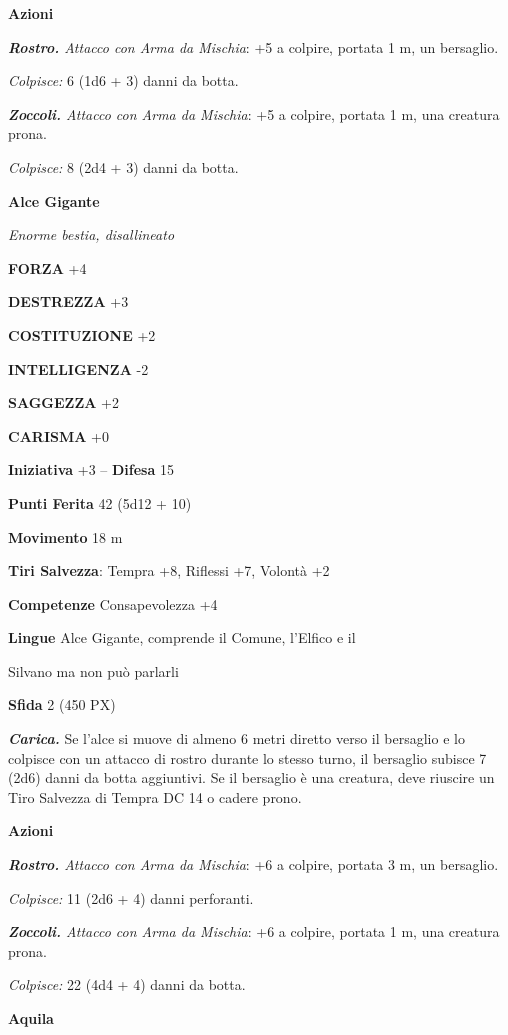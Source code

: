 \begin{multicols}{2}
\textbf{Azioni}

\textit{\textbf{Rostro.} Attacco con Arma da Mischia}: +5 a colpire, portata 1 m, un bersaglio.

\textit{Colpisce:} 6 (1d6 + 3) danni da botta.

\textit{\textbf{Zoccoli.} Attacco con Arma da Mischia}: +5 a colpire, portata 1 m, una creatura prona.

\textit{Colpisce:} 8 (2d4 + 3) danni da botta.

\medskip\textbf{Alce Gigante}

\textit{Enorme bestia, disallineato}

\textbf{FORZA} +4

\textbf{DESTREZZA} +3

\textbf{COSTITUZIONE} +2

\textbf{INTELLIGENZA} -2

\textbf{SAGGEZZA} +2

\textbf{CARISMA} +0

\textbf{Iniziativa} +3 -- \textbf{Difesa} 15

\textbf{Punti Ferita} 42 (5d12 + 10)

\textbf{Movimento} 18 m

\textbf{Tiri Salvezza}: Tempra +8, Riflessi +7, Volontà +2

\textbf{Competenze} Consapevolezza +4

\textbf{Lingue} Alce Gigante, comprende il Comune, l'Elfico e il

Silvano ma non può parlarli

\textbf{Sfida} 2 (450 PX)

\textit{\textbf{Carica.}} Se l'alce si muove di almeno 6 metri diretto verso il bersaglio e lo colpisce con un attacco di rostro durante lo stesso turno, il bersaglio subisce 7 (2d6) danni da botta aggiuntivi. Se il bersaglio è una creatura, deve riuscire un Tiro Salvezza di Tempra DC 14 o cadere prono.

\textbf{Azioni}

\textit{\textbf{Rostro.} Attacco con Arma da Mischia}: +6 a colpire, portata 3 m, un bersaglio.

\textit{Colpisce:} 11 (2d6 + 4) danni perforanti.

\textit{\textbf{Zoccoli.} Attacco con Arma da Mischia}: +6 a colpire, portata 1 m, una creatura prona.

\textit{Colpisce:} 22 (4d4 + 4) danni da botta.

\medskip\textbf{Aquila}


\end{multicols}
